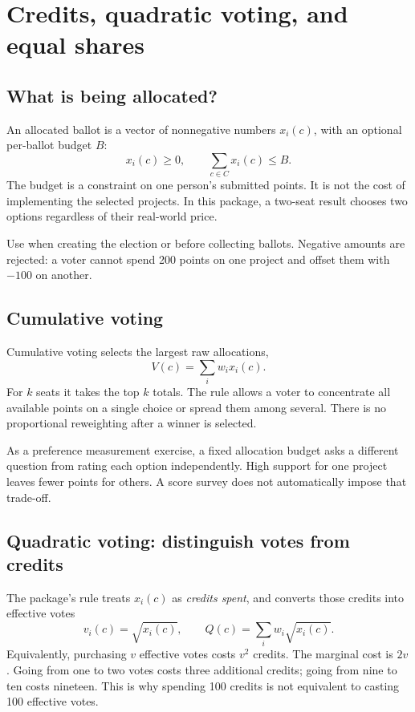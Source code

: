 \chapter{Credits, quadratic voting, and equal shares}
\label{chap:credits}
\section{What is being allocated?}
An allocated ballot is a vector of nonnegative numbers $x_i(c)$, with an optional per-ballot budget $B$:
\[
x_i(c)\geq0,\qquad \sum_{c\in C}x_i(c)\leq B.
\]
The budget is a constraint on one person's submitted points. It is not the cost of implementing the selected projects. In this package, a two-seat result chooses two options regardless of their real-world price.

Use  when creating the election or  before collecting ballots. Negative amounts are rejected: a voter cannot spend 200 points on one project and offset them with $-100$ on another.

\section{Cumulative voting}
Cumulative voting selects the largest raw allocations,
\[
V(c)=\sum_iw_i x_i(c).
\]
For $k$ seats it takes the top $k$ totals. The rule allows a voter to concentrate all available points on a single choice or spread them among several. There is no proportional reweighting after a winner is selected.

As a preference measurement exercise, a fixed allocation budget asks a different question from rating each option independently. High support for one project leaves fewer points for others. A score survey does not automatically impose that trade-off.

\section{Quadratic voting: distinguish votes from credits}
The package's  rule treats $x_i(c)$ as \emph{credits spent}, and converts those credits into effective votes
\[
v_i(c)=\sqrt{x_i(c)},\qquad
Q(c)=\sum_i w_i\sqrt{x_i(c)}.
\]
Equivalently, purchasing $v$ effective votes costs $v^2$ credits. The marginal cost is $2v$. Going from one to two votes costs three additional credits; going from nine to ten costs nineteen. This is why spending 100 credits is not equivalent to casting 100 effective votes.

